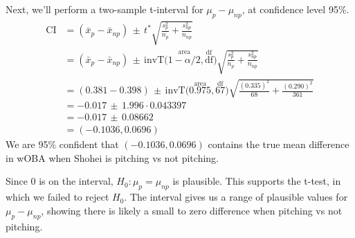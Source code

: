 \documentclass[12pt]{article}
\begin{document}
Next, we'll perform a two-sample t-interval for \(\mu_{p} - \mu_{np}\), at confidence level 95\%.
\begin{align*}
    \text{CI} & = (\bar{x}_p - \bar{x}_{np}) \, \pm \, t^* {\sqrt{\frac{s^2_p}{n_p} + \frac{{s^2_{np}}}{n_{np}}}}                                                              \\
              & = (\bar{x}_p - \bar{x}_{np}) \, \pm \, \text{invT}\Big(\overset{\text{area}}{1 - \alpha/2}, \overset{\text{df}}{\text{df}
    }\Big) {\sqrt{\frac{s^2_p}{n_p} + \frac{{s^2_{np}}}{n_{np}}}}                                                                                                              \\
              & = (0.381 - 0.398) \, \pm \, \text{invT}\Big(\overset{\text{area}}{0.975}, \overset{\text{df}}{67}\Big) \sqrt{\frac{{(0.335)}^2}{68} + \frac{{(0.290)}^2}{361}} \\
              & = -0.017 \, \pm \, 1.996 \cdot 0.043397                                                                                                                        \\
              & = -0.017 \, \pm \, 0.08662                                                                                                                                     \\
              & = \boxed{(-0.1036, 0.0696)}
\end{align*}
We are 95\% confident that \((-0.1036, 0.0696)\) contains the true mean difference in wOBA when Shohei is pitching vs not pitching.

Since 0 is on the interval, \(H_0: \mu_p = \mu_{np}\) is plausible. This supports the t-test, in which we failed to reject \(H_0\). The interval gives us a range of plausible values for \(\mu_{p} - \mu_{np}\), showing there is likely a small to zero difference when pitching vs not pitching.
\end{document}
